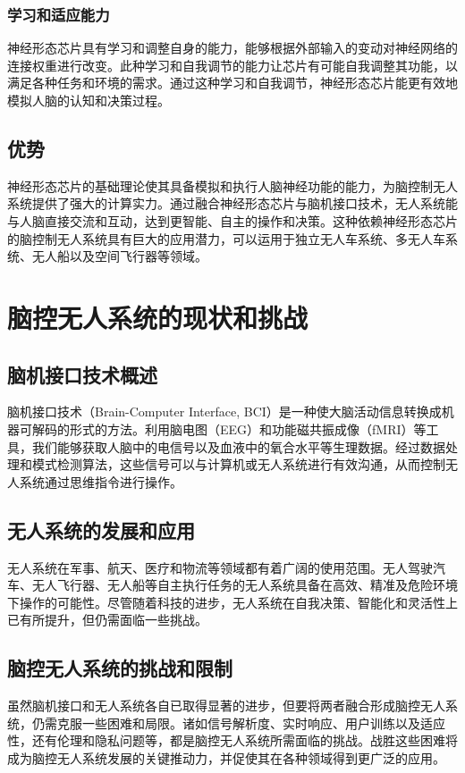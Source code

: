 \documentclass{thuemp}
\begin{document}
\subsubsection{学习和适应能力}
神经形态芯片具有学习和调整自身的能力，能够根据外部输入的变动对神经网络的连接权重进行改变。此种学习和自我调节的能力让芯片有可能自我调整其功能，以满足各种任务和环境的需求。通过这种学习和自我调节，神经形态芯片能更有效地模拟人脑的认知和决策过程。

\subsection{优势}
神经形态芯片的基础理论使其具备模拟和执行人脑神经功能的能力，为脑控制无人系统提供了强大的计算实力。通过融合神经形态芯片与脑机接口技术，无人系统能与人脑直接交流和互动，达到更智能、自主的操作和决策。这种依赖神经形态芯片的脑控制无人系统具有巨大的应用潜力，可以运用于独立无人车系统、多无人车系统、无人船以及空间飞行器等领域。

\section{脑控无人系统的现状和挑战}
\subsection{脑机接口技术概述}
脑机接口技术（Brain-Computer Interface, BCI）是一种使大脑活动信息转换成机器可解码的形式的方法。利用脑电图（EEG）和功能磁共振成像（fMRI）等工具，我们能够获取人脑中的电信号以及血液中的氧合水平等生理数据。经过数据处理和模式检测算法，这些信号可以与计算机或无人系统进行有效沟通，从而控制无人系统通过思维指令进行操作。

\subsection{无人系统的发展和应用}
无人系统在军事、航天、医疗和物流等领域都有着广阔的使用范围。无人驾驶汽车、无人飞行器、无人船等自主执行任务的无人系统具备在高效、精准及危险环境下操作的可能性。尽管随着科技的进步，无人系统在自我决策、智能化和灵活性上已有所提升，但仍需面临一些挑战。

\subsection{脑控无人系统的挑战和限制}
虽然脑机接口和无人系统各自已取得显著的进步，但要将两者融合形成脑控无人系统，仍需克服一些困难和局限。诸如信号解析度、实时响应、用户训练以及适应性，还有伦理和隐私问题等，都是脑控无人系统所需面临的挑战。战胜这些困难将成为脑控无人系统发展的关键推动力，并促使其在各种领域得到更广泛的应用。
\end{document}
